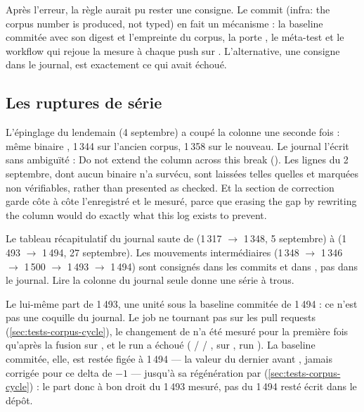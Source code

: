 \begin{decision}
Après l'erreur, la règle aurait pu rester une consigne. Le commit  (\og infra: the corpus number is produced, not typed\fg{}) en fait un mécanisme : la baseline commitée avec son digest et l'empreinte du corpus, la porte , le méta-test  et le workflow  qui rejoue la mesure à chaque push sur . L'alternative, une consigne dans le journal, est exactement ce qui avait échoué.
\end{decision}

\subsection{Les ruptures de série}

L'épinglage du lendemain (4 septembre) a coupé la colonne une seconde fois : même binaire , 1\,344 sur l'ancien corpus, 1\,358 sur le nouveau. Le journal l'écrit sans ambiguïté : \og Do not extend the column across this break\fg{} (). Les lignes du 2 septembre, dont aucun binaire n'a survécu, sont laissées telles quelles et marquées non vérifiables, \og rather than presented as checked\fg{}. Et la section de correction garde côte à côte l'enregistré et le mesuré, parce que \og erasing the gap by rewriting the column would do exactly what this log exists to prevent\fg{}.

\begin{piege}
Le tableau récapitulatif du journal saute de  (1\,317 $\to$ 1\,348, 5 septembre) à  (1\,493 $\to$ 1\,494, 27 septembre). Les mouvements intermédiaires (1\,348 $\to$ 1\,346 $\to$ 1\,500 $\to$ 1\,493 $\to$ 1\,494) sont consignés dans les commits  et dans , pas dans le journal. Lire la colonne du journal seule donne une série à trous.

Le  lui-même part de 1\,493, une unité sous la baseline commitée de 1\,494 : ce n'est pas une coquille du journal. Le job  ne tournant pas sur les pull requests (\cref{sec:tests-corpus-cycle}), le changement de  n'a été mesuré pour la première fois qu'après la fusion sur , et le run a échoué (\og {} /  / \fg{},  sur , run ). La baseline commitée, elle, est restée figée à 1\,494 — la valeur du dernier  avant , jamais corrigée pour ce delta de $-1$ — jusqu'à sa régénération par  (\cref{sec:tests-corpus-cycle}) : le  part donc à bon droit du 1\,493 mesuré, pas du 1\,494 resté écrit dans le dépôt.
\end{piege}


